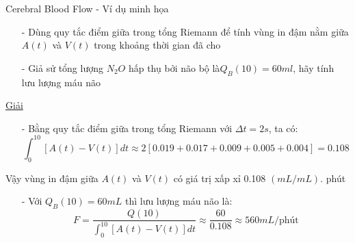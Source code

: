 \documentclass[12pt,a4paper]{article}
\begin{document}
\begin{enumerate}[a/]
\begin{table}[H]
			  \caption{Cerebral Blood Flow - Ví dụ minh họa}
	      \end{table}
	      \begin{itemize}
		      \item[-] Dùng quy tắc điểm giữa trong tổng Riemann để tính vùng in đậm nằm giữa $A(t)$ và $V(t)$ trong khoảng thời gian đã cho
		      \item[-] Giả sử tổng lượng $N_2O$ hấp thụ bởi não bộ là$ Q_B(10)=60ml$, hãy tính lưu lượng máu não
	      \end{itemize}
		  \newpage
	      \centering\underline{Giải}
	      \begin{itemize}
		      \item[-] Bằng quy tắc điểm giữa trong tổng Riemann với $\Delta t=2s$, ta có:
		            $$\int_{0}^{10}\left[A(t)-V(t)\right]dt\approx 2\left[0.019+0.017+0.009+0.005+0.004\right]=0.108$$
	      \end{itemize}
	      \begin{flushleft}
		      Vậy vùng in đậm giữa $A(t)$ và $V(t)$ có giá trị xấp xỉ 0.108 $(mL/mL)$. phút
	      \end{flushleft}
	      \begin{itemize}
		      \item[-] Với $Q_B(10)=60mL$ thì lưu lượng máu não là:
		            $$F=\frac{Q(10)}{\displaystyle \int_{0}^{10}\left[A(t)-V(t)\right]dt} \approx \frac{60}{0.108} \approx 560mL/\text{phút}$$
	      \end{itemize}
\end{enumerate}

\newpage
\end{document}
